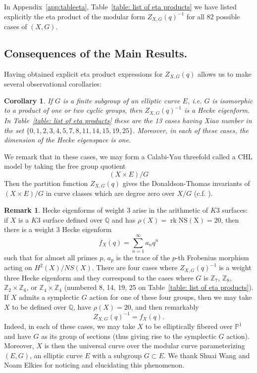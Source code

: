 \documentclass{amsart}
\newtheorem{corollary}[theorem]{Corollary}
\theoremstyle{definition}
\newtheorem{remark}[theorem]{Remark}
\newcommand{\ZZ} {{\mathbb Z}}		%
\newcommand{\QQ} {{\mathbb Q}}		%
\newcommand{\PP}{\mathbb{P}}
\begin{document}
In Appendix~\ref{app:tableeta}, Table~\ref{table: list of eta
products} we have listed explicitly the eta product of the modular form
$Z_{X,G}(q)^{-1}$ for all 82 possible cases of $(X,G)$.

\subsection{Consequences of the Main Results.}  Having obtained
explicit eta product expressions for $Z_{X,G}(q)$ allows us to make
several observational corollaries:

\begin{corollary}\label{cor: if G is a subgp of E then Zinv is a Hecke
eigenform} If $G$ is a finite subgroup of an elliptic curve $E$,
i.e. $G$ is isomorphic to a product of one or two cyclic groups, then
$Z_{X,G}(q)^{-1}$ is a Hecke eigenform. In Table~\ref{table: list of
eta products} these are the 13 cases having Xiao number in the set
$\{0,1,2,3,4,5,7,8,11,14,15,19,25 \}$. Moreover, in each of these
cases, the dimension of the Hecke eigenspace is one.
\end{corollary}

We remark that in these cases, we may form a Calabi-Yau threefold
called a CHL model by taking the free group quotient
\[
(X\times E)/G
\]
Then the partition function $Z_{X,G}(q)$ gives the Donaldson-Thomas
invariants of $(X\times E)/G$ in curve classes which are degree zero
over $X/G$ (c.f. \cite{bryan2018chl}).


\begin{remark}\label{rem: weight 3 Hecke case corresponds to arithmetic}
Hecke eigenforms of weight 3 arise in the arithmetic of $K3$ surfaces:
if $X$ is a $K3$ surface defined over $\QQ$ and has 
$\rho (X)=\operatorname{rk}\operatorname{NS(X)}=20$, then there is a weight 3 Hecke
eigenform
\[
f_{X}(q) = \sum_{n=1}^{\infty} a_{n}q^{n}
\]
such that for almost all primes $p$, $a_{p}$ is the trace of the
$p$-th Frobenius morphism acting on $H^{2}(X)/NS(X)$. There are four
cases where $Z_{X,G}(q)^{-1}$ is a weight three Hecke eigenform and
they correspond to the cases where $G$ is $\ZZ _7$, $\ZZ _8$, $\ZZ
_2\times \ZZ _6$, or $\ZZ _4\times \ZZ _4$ (numbered 8, 14, 19, 25 on
Table~\ref{table: list of eta products}). If $X$ admits a symplectic
$G$ action for one of these four groups, then we may take $X$ to be
defined over $\QQ$, have $\rho (X)=20$, and then remarkably
\[
Z_{X,G}(q)^{-1} = f_{X}(q).
\]
Indeed, in each of these cases, we may take $X$ to be elliptically
fibered over $\PP^{1}$ and have $G$ as its group of sections (thus
giving rise to the symplectic $G$ action). Moreover, $X$ is then the
universal curve over the modular curve parameterizing $(E,G)$, an
elliptic curve $E$ with a subgroup $G\subset E$. We thank Shuai Wang
and Noam Elkies for noticing and elucidating this phenomenon.
\end{remark}
\end{document}
